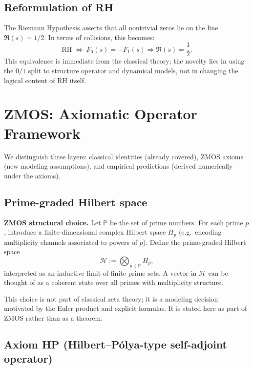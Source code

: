 \documentclass[11pt]{article}
\begin{document}
\subsection{Reformulation of RH}

The Riemann Hypothesis asserts that all nontrivial zeros lie on the line $\Re(s)=1/2$.  In terms of collisions, this becomes:
\begin{equation}
  \text{RH} \;\Longleftrightarrow\; F_0(s)=-F_1(s) \Rightarrow \Re(s)=\frac12.
\end{equation}
This equivalence is immediate from the classical theory; the novelty lies in using the $0/1$ split to structure operator and dynamical models, not in changing the logical content of RH itself.

\section{ZMOS: Axiomatic Operator Framework}

We distinguish three layers: classical identities (already covered), ZMOS axioms (new modeling assumptions), and empirical predictions (derived numerically under the axioms).

\subsection{Prime-graded Hilbert space}

\textbf{ZMOS structural choice.}
Let $\mathbb{P}$ be the set of prime numbers.  For each prime $p$, introduce a finite-dimensional complex Hilbert space $H_p$ (e.g.\ encoding multiplicity channels associated to powers of $p$).  Define the prime-graded Hilbert space
\begin{equation}
  \mathcal{H} := \bigotimes_{p\in\mathbb{P}} H_p,
\end{equation}
interpreted as an inductive limit of finite prime sets.  A vector in $\mathcal{H}$ can be thought of as a coherent state over all primes with multiplicity structure.

This choice is not part of classical zeta theory; it is a modeling decision motivated by the Euler product and explicit formulas.  It is stated here as part of ZMOS rather than as a theorem.

\subsection{Axiom HP (Hilbert--Pólya-type self-adjoint operator)}
\end{document}
